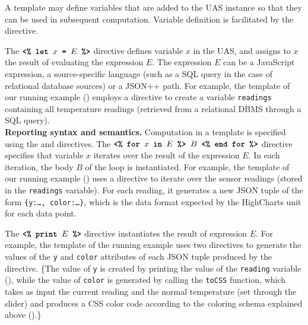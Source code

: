  A template may define variables that are added to the UAS instance so that they can be used in subsequent computation. Variable definition is facilitated by the  directive.

The $\texttt{\textbf{<\% let }} x \texttt{\textbf{ = }} E \texttt{\textbf{ \%>}}$ directive defines variable $x$ in the UAS, and assigns to
$x$ the result of evaluating the expression $E$. The expression $E$ can be a JavaScript expression, a source-specific language (such as a SQL query in the case of relational database sources) or a JSON++ path. For example, the template of our running example () employs a  directive to create a variable \texttt{readings} containing all temperature readings (retrieved from a relational DBMS through a SQL query).\\

{\bf Reporting syntax and semantics.} Computation in a template is specified using the  and  directives.
The $\texttt{\textbf{<\% for }} x \texttt{\textbf{ in }} E \texttt{\textbf{ \%> }} B \texttt{\textbf{ <\% end for \%>}}$ directive specifies that variable $x$ iterates over the result of the expression $E$. In each iteration, the body $B$ of the  loop is instantiated. For example, the template of our running example () uses a  directive to iterate over the sensor readings (stored in the \texttt{readings} variable). For each reading, it generates a new JSON tuple of the form \texttt{\{y:\ldots, color:\ldots\}}, which is the data format expected by the HighCharts unit for each data point. 


The $\texttt{\textbf{<\% print }} E \texttt{\textbf{ \%>}}$ directive instantiates the result of expression $E$. For example, the template of the running example uses two  directives to generate the values of the \texttt{y} and \texttt{color} attributes of each JSON tuple produced by the  directive. \{The value of \texttt{y} is created by printing the value of the \texttt{reading} variable (), while the value of \texttt{color} is generated by calling the \texttt{toCSS} function, which takes as input the current reading and the normal temperature (set through the slider) and produces a CSS color code according to the coloring schema explained above ().\}\\


